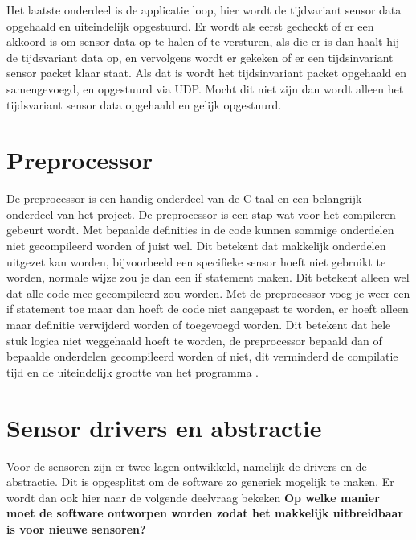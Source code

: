 \noindent Het laatste onderdeel is de applicatie loop, hier wordt de tijdvariant sensor data opgehaald en uiteindelijk opgestuurd. Er wordt als eerst gecheckt of er een akkoord is om sensor data op te halen of te versturen, als die er is dan haalt hij de tijdsvariant data op, en vervolgens wordt er gekeken of er een tijdsinvariant sensor packet klaar staat. Als dat is wordt het tijdsinvariant packet opgehaald en samengevoegd, en opgestuurd via UDP. Mocht dit niet zijn dan wordt alleen het tijdsvariant sensor data opgehaald en gelijk opgestuurd. \newline

\section{Preprocessor} \label{sec:preprocessor}
De preprocessor is een handig onderdeel van de C taal en een belangrijk onderdeel van het project. De preprocessor is een stap wat voor het compileren gebeurt wordt. Met bepaalde definities in de code kunnen sommige onderdelen niet gecompileerd worden of juist wel. Dit betekent dat makkelijk onderdelen uitgezet kan worden, bijvoorbeeld een specifieke sensor hoeft niet gebruikt te worden, normale wijze zou je dan een if statement maken. Dit betekent alleen wel dat alle code mee gecompileerd zou worden. Met de preprocessor voeg je weer een if statement toe maar dan hoeft de code niet aangepast te worden, er hoeft alleen maar definitie verwijderd worden of toegevoegd worden. Dit betekent dat hele stuk logica niet weggehaald hoeft te worden, de preprocessor bepaald dan of bepaalde onderdelen gecompileerd worden of niet, dit verminderd de compilatie tijd en de uiteindelijk grootte van het programma \autocite{preprocessor}. 

\section{Sensor drivers en abstractie}
Voor de sensoren zijn er twee lagen ontwikkeld, namelijk de drivers en de abstractie. Dit is opgesplitst om de software zo generiek mogelijk te maken. Er wordt dan ook hier naar de volgende deelvraag bekeken \textbf{Op welke manier moet de software ontworpen worden zodat het makkelijk uitbreidbaar is voor nieuwe sensoren?} \newline 

